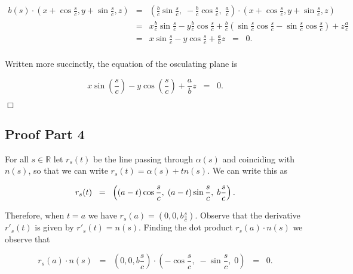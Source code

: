 \documentclass{article}
\begin{document}
\begin{eqnarray*}
b(s) \cdot  \left ( x + \cos \frac{s}{c}, y + \sin \frac{s}{c}, z \right )& = & \left ( \frac{b}{c} \sin \frac{s}{c}, \; - \frac{b}{c} \cos \frac{s}{c}, \; \frac{a}{c} \right ) \cdot  \left ( x + \cos \frac{s}{c}, y + \sin \frac{s}{c}, z \right ) \\
& = & x \frac{b}{c} \sin \frac{s}{c} - y \frac{b}{c} \cos \frac{s}{c} + \frac{b}{c} \left ( \sin \frac{s}{c} \cos\frac{s}{c} - \sin \frac{s}{c} \cos \frac{s}{c} \right ) +z \frac{a}{c}  \\
& = & x \sin \frac{s}{c} - y \cos \frac{s}{c} + \frac{a}{b}z \;\; = \;\; 0. \\
\end{eqnarray*}

\noindent Written more succinctly, the equation of the osculating plane is 

\begin{equation*}
x \sin \left (\frac{s}{c} \right )- y \cos \left ( \frac{s}{c} \right )+ \frac{a}{b} z \;\; = \;\;0.
\end{equation*}

\noindent \hfill $\Box$


\subsection*{Proof Part 4}

\noindent For all $s \in \mathbb{R}$ let $r_s(t)$ be the line passing through $\alpha(s)$ and coinciding with $n(s)$, so that we can write $r_s(t) = \alpha(s) +t n(s)$.  We can write this as 

\begin{equation*}
r_s(t) \;\; = \;\; \left ( (a-t) \cos \frac{s}{c}, \; (a-t) \sin \frac{s}{c}, \; b\frac{s}{c} \right ). \\
\end{equation*}

\noindent Therefore, when $t =a$ we have $r_s(a) = \left (0,0, b \frac{s}{c} \right )$.  Observe that the derivative $r'_s(t)$ is given by $r'_s(t) = n(s)$.  Finding the dot product $r_s(a) \cdot n(s)$ we observe that

\begin{equation*}
r_s(a) \cdot n(s) \;\; = \;\; \left ( 0, 0, b \frac{s}{c} \right ) \cdot \left ( -\cos \frac{s}{c}, \; -\sin \frac{s}{c}, \; 0 \right ) \;\; =\;\;0.
\end{equation*}
\end{document}
